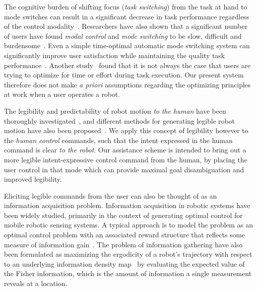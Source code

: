 \documentclass[conference]{IEEEtran}
\begin{document}
The cognitive burden of shifting focus (\textit{task switching}) from the task at hand to mode switches can result in a significant decrease in task performance regardless of the control modality~\cite{monsell2003task}. Researchers have also shown that a significant number of users have found \textit{modal control} and \textit{mode switching} to be slow, difficult and burdensome~\cite{herlant2016assistive}. Even a simple time-optimal automatic mode switching system can significantly improve user satisfaction while maintaining the quality task performance~\cite{herlant2016assistive}.  Another study~\cite{gopinath2017human} found that it is not always the case that users are trying to optimize for time or effort during task execution. Our present system therefore does not make \textit{a priori} assumptions regarding the optimizing principles at work when a user operates a robot.

The legibility and predictability of robot motion \textit{to the human} have been thoroughly investigated~\cite{dragan2013legibility}, and different methods for generating legible robot motion have also been proposed~\cite{holladay2014legible}. We apply this concept of legibility however to the \textit{human control} commands, such that the intent expressed in the human command is clear \textit{to the robot}. Our assistance scheme is intended to bring out a more legible intent-expressive control command from the human, by placing the user control in that mode which can provide maximal goal disambiguation and improved legibility.

Eliciting legible commands from the user can also be thought of as an information acquisition problem. Information acquisition in robotic systems  have been widely studied, primarily in the context of generating optimal control for mobile robotic sensing systems. A typical approach is to model the problem as an optimal control problem with an associated reward structure that reflects some measure of information gain~\cite{atanasov2014information}. The problem of information gathering have also been formulated as maximizing the ergodicity of a robot's trajectory with respect to an underlying information density map~\cite{miller2013trajectory,miller2016ergodic} by evaluating the expected value of the Fisher information, which is the amount of information a single measurement reveals at a location. 
\end{document}
